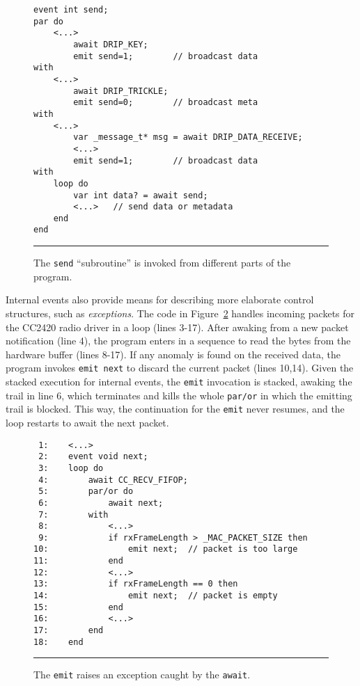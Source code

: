 \documentclass[10pt]{sensys-proc}
\newcommand{\code}[1] {{\small{\texttt{#1}}}}
\begin{document}

\begin{figure}[t]
{\small
\begin{verbatim}
event int send;
par do
    <...>
        await DRIP_KEY;
        emit send=1;        // broadcast data
with
    <...>
        await DRIP_TRICKLE;
        emit send=0;        // broadcast meta
with
    <...>
        var _message_t* msg = await DRIP_DATA_RECEIVE;
        <...>
        emit send=1;        // broadcast data
with
    loop do
        var int data? = await send;
        <...>   // send data or metadata
    end
end
\end{verbatim}
}
\rule{8.5cm}{0.37pt}
\caption{ The \code{send} ``subroutine'' is invoked from different parts of the 
program.
\label{lst.func}
}
\end{figure}

Internal events also provide means for describing more elaborate control 
structures, such as \emph{exceptions}.
The code in Figure~\ref{lst.exception} handles incoming packets for the CC2420 
radio driver in a loop (lines 3-17).
After awaking from a new packet notification (line 4), the program enters in a 
sequence to read the bytes from the hardware buffer (lines 8-17).
If any anomaly is found on the received data, the program invokes 
\code{emit~next} to discard the current packet (lines 10,14).
Given the stacked execution for internal events, the \code{emit} invocation is 
stacked, awaking the trail in line 6, which terminates and kills the whole 
\code{par/or} in which the emitting trail is blocked.
This way, the continuation for the \code{emit} never resumes, and the loop 
restarts to await the next packet.


\begin{figure}[t]
{\small
\begin{verbatim}
 1:    <...>
 2:    event void next;
 3:    loop do
 4:        await CC_RECV_FIFOP;
 5:        par/or do
 6:            await next;
 7:        with
 8:            <...>
 9:            if rxFrameLength > _MAC_PACKET_SIZE then
10:                emit next;  // packet is too large
11:            end
12:            <...>
13:            if rxFrameLength == 0 then
14:                emit next;  // packet is empty
15:            end
16:            <...>
17:        end
18:    end
\end{verbatim}
}
\rule{8.5cm}{0.37pt}
\caption{ The \code{emit} raises an exception caught by the \code{await}.
\label{lst.exception}
}
\end{figure}
\end{document}
